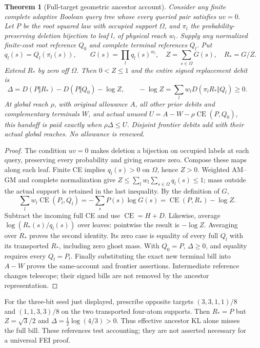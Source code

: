 \documentclass[11pt]{article}
\newtheorem{theorem}[lemma]{Theorem}
\begin{document}
\begin{theorem}[Full-target geometric ancestor account]\label{thm:v10geo}
Consider any finite complete adaptive Boolean query tree whose every
queried pair satisfies $uv=0$. Let $P$ be the root squared law with
occupied support $\Omega$, and $\pi_l$ the probability-preserving
deletion bijection to leaf $l$, of physical reach $w_l$. Supply any
normalized finite-cost root reference $Q_0$ and complete terminal
references $Q_l$. Put
\[
 q_l(s)=Q_l(\pi_l(s)),\qquad
 G(s)=\prod_lq_l(s)^{w_l},\quad Z=\sum_{s\in\Omega}G(s),\quad R_*=G/Z.
\]
Extend $R_*$ by zero off $\Omega$. Then $0<Z\le1$ and the entire signed
replacement debit is
\[
 \Delta=D(P\Vert R_*)-D(P\Vert Q_0)-\log Z,
 \qquad -\log Z=\sum_l w_lD(\pi_lR_*\Vert Q_l)\ge0.
\]
At global reach $\rho$, with original allowance $A$, all other prior
debits and complementary terminals $W$, and actual unused
$U=A-W-\rho\operatorname{CE}(P,Q_0)$, this handoff is paid exactly when
$\rho\Delta\le U$. Disjoint frontier debits add with their actual
global reaches. No allowance is renewed.
\end{theorem}
\begin{proof}
The condition $uv=0$ makes deletion a bijection on occupied labels at
each query, preserving every probability and giving erasure zero.
Compose these maps along each leaf. Finite CE implies $q_l(s)>0$ on
$\Omega$, hence $Z>0$. Weighted AM--GM and complete normalization give
$Z\le\sum_lw_l\sum_{s\in\Omega}q_l(s)\le1$; mass outside the actual
support is retained in the last inequality. By the definition of $G$,
\[
 \sum_lw_l\operatorname{CE}(P_l,Q_l)
 =-\sum_sP(s)\log G(s)=\operatorname{CE}(P,R_*)-\log Z.
\]
Subtract the incoming full CE and use $\operatorname{CE}=H+D$.
Likewise, average $\log(R_*(s)/q_l(s))$ over leaves: pointwise the result
is $-\log Z$. Averaging over $R_*$ proves the second identity. Its zero
case is equality of every full $Q_l$ with its transported $R_*$,
including zero ghost mass. With $Q_0=P$, $\Delta\ge0$, and equality
requires every $Q_l=P_l$. Finally substituting the exact new terminal
bill into $A-W$ proves the same-account and frontier assertions.
Intermediate reference changes telescope; their signed bills are not
removed by the ancestor representation.
\end{proof}

For the three-bit seed just displayed, prescribe opposite targets
$(3,3,1,1)/8$ and $(1,1,3,3)/8$ on the two transported four-atom
supports. Then $R_*=P$ but $Z=\sqrt3/2$ and
$\Delta=\frac12\log(4/3)>0$. Thus effective ancestor KL alone misses
the full bill. These references test accounting; they are not asserted
necessary for a universal FEI proof.
\end{document}
